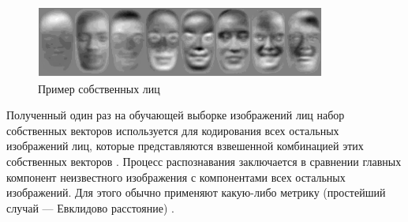 \begin{figure}[h]
	\centering
	\includegraphics[width=0.85\textwidth]{img/pca2.png} 
	\caption{Пример собственных лиц \cite{brilyuk}}
	\label{fig:pca2}
\end{figure}

Полученный один раз на обучающей выборке изображений лиц набор собственных векторов используется для кодирования всех остальных изображений лиц, которые представляются взвешенной комбинацией этих собственных векторов \cite{parshin}. Процесс распознавания заключается в сравнении главных компонент неизвестного изображения с компонентами всех остальных изображений. Для этого обычно применяют какую-либо метрику (простейший случай --- Евклидово расстояние) \cite{brilyuk}. 
	